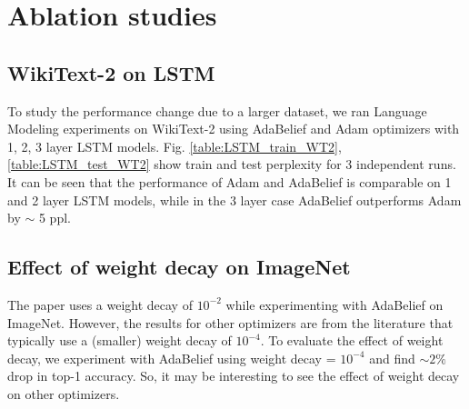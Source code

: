 \section{Ablation studies}
\label{lab:ablation}
\subsection{WikiText-2 on LSTM}
\label{lab:WT2_LSTM}
To study the performance change due to a larger dataset, we ran Language Modeling experiments on WikiText-2 \cite{WikiText_2} using AdaBelief and Adam optimizers with 1, 2, 3 layer LSTM models. Fig. \ref{table:LSTM_train_WT2}, \ref{table:LSTM_test_WT2} show train and test perplexity for 3 independent runs. It can be seen that the performance of Adam and AdaBelief is comparable on 1 and 2 layer LSTM models, while in the 3 layer case AdaBelief outperforms Adam by $\sim$ 5 ppl.

\subsection{Effect of weight decay on ImageNet}
\label{lab:wd_effect}
The paper \cite{zhuang_adabelief_2020} uses a weight decay of $10^{-2}$ while experimenting with AdaBelief on ImageNet. However, the results for other optimizers are from the literature that typically use a (smaller) weight decay of $10^{-4}$. To evaluate the effect of weight decay, we experiment with AdaBelief using weight decay = $10^{-4}$ and find $\sim 2\%$ drop in top-1 accuracy. So, it may be interesting to see the effect of weight decay on other optimizers.



